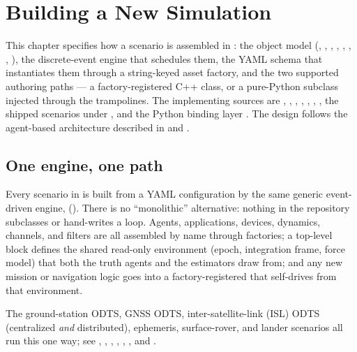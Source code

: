 \chapter{Building a New Simulation}
\label{chap:new-simulation}

This chapter specifies how a scenario is assembled in \lupnt{}: the object model
(, , , , ,
, , ), the discrete-event engine that
schedules them, the YAML schema that instantiates them through a string-keyed
asset factory, and the two supported authoring paths --- a factory-registered
C++ class, or a pure-Python subclass injected through the 
trampolines. The implementing sources are
, ,
, ,
, ,
, the shipped scenarios under
, and the Python binding layer
. The design follows the agent-based
architecture described in \citep{iiyama2023lupnt,casadesus2025lupnt} and
\citep{iiyama2026thesis}.

\section{One engine, one path}
\label{sec:sim-one-engine}

Every scenario in \lupnt{} is built from a YAML configuration by the same generic
event-driven engine, 
(). There is no ``monolithic''
alternative: nothing in the repository subclasses  or hand-writes
a  loop. Agents, applications, devices, dynamics, channels, and
filters are all assembled by name through factories; a top-level 
block defines the shared read-only environment (epoch, integration frame, force
model) that both the truth agents and the estimators draw from; and any new
mission or navigation logic goes into a factory-registered  that
self-drives from that environment.

The ground-station ODTS, GNSS ODTS, inter-satellite-link (ISL) ODTS (centralized
\emph{and} distributed), ephemeris, surface-rover, and lander scenarios all run
this one way; see ,
, ,
, ,
, and .

